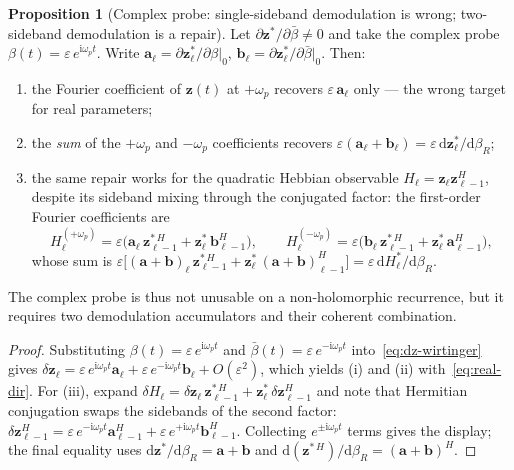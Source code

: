 \documentclass[11pt]{article}
\newcommand{\im}{\mathrm{i}}
\newcommand{\dd}{\mathrm{d}}
\theoremstyle{definition}
\newtheorem{proposition}{Proposition}
\begin{document}
\begin{proposition}[Complex probe: single-sideband demodulation is
wrong; two-sideband demodulation is a repair]\label{prop:cplx-fail}
Let $\partial\bm{z}^*/\partial\bar\beta \ne 0$ and take the complex
probe $\beta(t) = \varepsilon\,e^{\im\omega_p t}$.  Write
$\bm{a}_\ell = \partial\bm{z}^*_\ell/\partial\beta|_0$,
$\bm{b}_\ell = \partial\bm{z}^*_\ell/\partial\bar\beta|_0$.  Then:
\begin{enumerate}[label=(\roman*)]
\item the Fourier coefficient of $\bm{z}(t)$ at $+\omega_p$ recovers
$\varepsilon\,\bm{a}_\ell$ only --- the wrong target for real
parameters;
\item the \emph{sum} of the $+\omega_p$ and $-\omega_p$ coefficients
recovers $\varepsilon(\bm{a}_\ell+\bm{b}_\ell)
= \varepsilon\,\dd\bm{z}^*_\ell/\dd\beta_R$;
\item the same repair works for the quadratic Hebbian observable
$H_\ell = \bm{z}_\ell\bm{z}_{\ell-1}^H$, despite its sideband mixing
through the conjugated factor: the first-order Fourier coefficients
are
\[
  H_\ell^{(+\omega_p)}
  = \varepsilon\bigl(\bm{a}_\ell\,\bm{z}_{\ell-1}^{*\,H}
    + \bm{z}_\ell^*\,\bm{b}_{\ell-1}^{H}\bigr),
  \qquad
  H_\ell^{(-\omega_p)}
  = \varepsilon\bigl(\bm{b}_\ell\,\bm{z}_{\ell-1}^{*\,H}
    + \bm{z}_\ell^*\,\bm{a}_{\ell-1}^{H}\bigr),
\]
whose sum is
$\varepsilon\bigl[(\bm{a}+\bm{b})_\ell\,\bm{z}_{\ell-1}^{*\,H}
+ \bm{z}_\ell^*\,(\bm{a}+\bm{b})_{\ell-1}^{H}\bigr]
= \varepsilon\,\dd H_\ell^*/\dd\beta_R$.
\end{enumerate}
The complex probe is thus not unusable on a non-holomorphic
recurrence, but it requires two demodulation accumulators and their
coherent combination.
\end{proposition}
\begin{proof}
Substituting $\beta(t) = \varepsilon\,e^{\im\omega_p t}$ and
$\bar\beta(t) = \varepsilon\,e^{-\im\omega_p t}$
into~\eqref{eq:dz-wirtinger} gives
$\delta\bm{z}_\ell = \varepsilon\,e^{\im\omega_p t}\bm{a}_\ell
+ \varepsilon\,e^{-\im\omega_p t}\bm{b}_\ell + O(\varepsilon^2)$,
which yields (i) and (ii) with~\eqref{eq:real-dir}.  For (iii),
expand $\delta H_\ell = \delta\bm{z}_\ell\,\bm{z}_{\ell-1}^{*\,H}
+ \bm{z}_\ell^*\,\delta\bm{z}_{\ell-1}^{H}$ and note that Hermitian
conjugation swaps the sidebands of the second factor:
$\delta\bm{z}_{\ell-1}^{H}
= \varepsilon\,e^{-\im\omega_p t}\bm{a}_{\ell-1}^{H}
+ \varepsilon\,e^{+\im\omega_p t}\bm{b}_{\ell-1}^{H}$.  Collecting
$e^{\pm\im\omega_p t}$ terms gives the display; the final equality
uses $\dd\bm{z}^*/\dd\beta_R = \bm{a}+\bm{b}$ and
$\dd(\bm{z}^{*\,H})/\dd\beta_R = (\bm{a}+\bm{b})^{H}$.
\end{proof}
\end{document}
